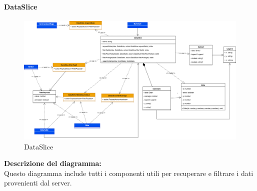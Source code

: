 \paragraph{DataSlice}
\begin{figure}[h!] \centering
    \includegraphics[scale=0.15]{template/images/uml_front/logic/DataSlice.png}
    \caption{DataSlice}
\end{figure}
\textbf{Descrizione del diagramma:}\\
Questo diagramma include tutti i componenti utili per recuperare e filtrare i dati provenienti dal server.
